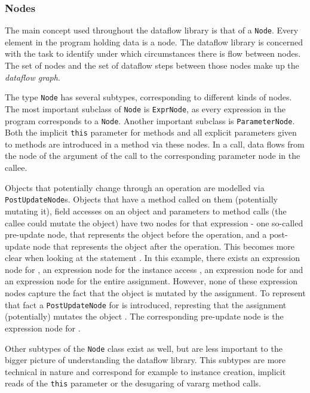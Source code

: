 \subsubsection*{Nodes}
The main concept used throughout the dataflow library is that of a \texttt{Node}.
Every element in the program holding data is a node.
The dataflow library is concerned with the task to identify 
under which circumstances there is flow between nodes.
The set of nodes and the set of dataflow steps between those nodes make up the 
\emph{dataflow graph}.

The type \texttt{Node} has several subtypes, corresponding to different kinds of nodes.
The most important subclass of \texttt{Node} is \texttt{ExprNode}, 
as every expression in the program corresponds to a \texttt{Node}.
Another important subclass is \texttt{ParameterNode}.
Both the implicit \texttt{this} parameter for methods and all explicit parameters
given to methods are introduced in a method via these nodes.
In a call, data flows from the node of the argument of the 
call to the corresponding parameter node in the callee.

Objects that potentially change through an operation are modelled
 via \texttt{PostUpdateNode}s.
Objects that have a method called on them (potentially mutating it),
field accesses on an object and parameters to method calls (the callee could mutate the object)
have two nodes for that expression - one so-called pre-update node, that represents 
the object before the operation, and a post-update node that represents 
the object after the operation.
This becomes more clear when looking at the statement .
In this example, there exists an expression node for 
, an expression node for the instance access ,
an expression node for  and an expression node for the entire assignment.
However, none of these expression nodes capture the fact that the object 
is mutated by the assignment.
To represent that fact a \texttt{PostUpdateNode} for  is introduced,
represting that the assignment (potentially) mutates the object .
The corresponding pre-update node is the expression node for .

Other subtypes of the \texttt{Node} class exist as well, 
but are less important to the bigger picture of understanding the dataflow library.
This subtypes are more technical in nature and correspond for example 
to instance creation, implicit reads of the \texttt{this} parameter or
the desugaring of vararg method calls.

